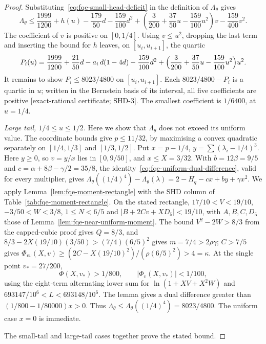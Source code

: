 \begin{proof}
Substituting~\eqref{eq:fqe-small-head-deficit} in the definition of $\Lambda_\theta$ gives
\[
 \Lambda_\theta\le\frac{1999}{1200}+h(u)-\frac{179}{50}d
       -\frac{159}{100}d^2
       +\left(\frac3{200}+\frac{37}{50}u-\frac{159}{100}u^2\right)v
       -\frac{159}{400}v^2.
\]
The coefficient of $v$ is positive on $[0,1/4]$. Using $v\le u^2$, dropping the last term and inserting the bound for $h$ leaves, on $[u_i,u_{i+1}]$, the quartic
\[
 P_i(u)=\frac{1999}{1200}+\frac{21}{50}d-a_i\,d(1-4d)-\frac{159}{100}d^2
       +\Bigl(\frac3{200}+\frac{37}{50}u-\frac{159}{100}u^2\Bigr)u^2 .
\]
It remains to show $P_i\le8023/4800$ on $[u_i,u_{i+1}]$. Each $8023/4800-P_i$ is a quartic in $u$; written in the
Bernstein basis of its interval, all five coefficients are positive [exact-rational certificate; SHD-3]. The smallest coefficient is $1/6400$, at $u=1/4$.

\emph{Large tail, $1/4\le u\le1/2$.} Here we show that $\Lambda_\theta$ does not exceed its uniform value.
The coordinate bounds give $p\le11/32$, by maximising a convex
quadratic separately on $[1/4,1/3]$ and $[1/3,1/2]$.
Put $x=p-1/4$, $y=\sum(\lambda_i-1/4)^3$.
Here $y\ge0$, so $v=y/x$ lies in $[0,9/50]$, and $x\le X=3/32$.
With $b=12\beta=9/5$ and $c=\alpha+8\beta-\gamma/2=35/8$, the identity~\eqref{eq:fqe-uniform-dual-difference},
valid for every multiplier, gives $\Lambda_\theta((1/4)^4)-\Lambda_\theta(\lambda)=2-H_q-cx+by+\gamma x^2$.
We apply Lemma~\ref{lem:fqe-moment-rectangle} with the SHD column of Table~\ref{tab:fqe-moment-rectangle}.
On the stated rectangle,
$17/10<V<19/10$, $-3/50<W<3/8$, $1\le N<6/5$ and $|B+2Cv+XD_5|<19/10$,
with $A,B,C,D_5$ those of Lemma~\ref{lem:fqe-near-uniform-moment}.
The bound $V^2-2W>8/3$ from the capped-cubic proof gives $Q=8/3$, and
$8/3-2X(19/10)(3/50)>(7/4)(6/5)^2$ gives $m=7/4>2\rho\gamma$; $C>7/5$ gives
$\Phi_{vv}(X,v)\ge(2C-X(19/10)^2)/(\rho(6/5)^2)>4=\kappa$.
At the single point $v_*=27/200$,
\[
 \Phi(X,v_*)>1/800,\qquad |\Phi_v(X,v_*)|<1/100,
\]
using the eight-term alternating lower sum for
$\ln(1+XV+X^2W)$ and $693147/10^6<L<693148/10^6$.
The lemma gives a dual difference greater than $(1/800-1/80000)x>0$.
Thus $\Lambda_\theta\le\Lambda_\theta((1/4)^4)=8023/4800$.
The uniform case $x=0$ is immediate.

The small-tail and large-tail cases together prove the stated bound.
\end{proof}
